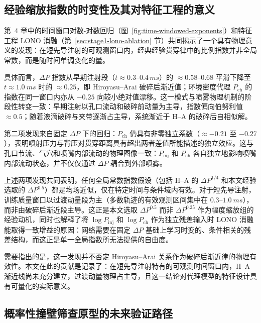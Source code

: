 \subsection{经验缩放指数的时变性及其对特征工程的意义}

第~4 章中的时间窗口对数-对数回归（图~\ref{fig:time-windowed-exponents}）和特征工程 LONO 消融（第~\ref{sec:stage1-lono-ablation} 节）共同揭示了一个具有物理意义的发现：在短先导注射的可观测窗口内，经典经验贯穿律中的比例指数并非全局常数，而是随时间单调变化的量。

具体而言，\(\Delta P\) 指数从早期注射段（\(t\approx0.3\)--\(0.4\,\si{ms}\)）的 \(\approx0.58\)--\(0.68\) 平滑下降至 \(t\approx\SI{1.0}{ms}\) 时的 \(\approx0.25\)，即 Hiroyasu--Arai 破碎后渐近值；环境密度代理 \(P_\mathrm{ch}\) 的指数在同一窗口内亦从 \(-0.25\) 向较小绝对值漂移。这一模式与喷雾物理机制的阶段性转变一致：早期注射以孔口流动和破碎前动量为主导，指数偏向伯努利值 \(\approx0.5\)；随着液滴破碎与夹带逐渐占主导，系统渐近于 H--A 的破碎后自相似解。

第二项发现来自固定 \(\Delta P\) 下的回归：\(P_\mathrm{ch}\) 仍具有非零独立系数（\(\approx-0.21\) 至 \(-0.27\)），表明喷射压力与背压对贯穿距离具有超出两者差值所能描述的独立效应。这与孔口节流、气穴和喷嘴内部流动的物理图像一致：\(P_\mathrm{inj}\) 和 \(P_\mathrm{ch}\) 各自独立地影响喷嘴内部流动状态，并不仅仅通过 \(\Delta P\) 耦合到外部喷雾。

上述两项发现共同表明，任何全局常数指数假设（包括 H--A 的 \(\Delta P^{1/4}\) 和本文经验选取的 \(\Delta P^{0.5}\)）都是均场近似，仅在特定时间与条件域内有效。对于短先导注射，训练质量窗口以过渡动量段为主（多数轨迹的有效观测区间集中在 \(0.3\)--\(\SI{1.0}{ms}\)），而非由破碎后渐近段主导。这正是本文选取 \(\Delta P^{0.5}\) 而非 \(\Delta P^{0.25}\) 作为幅度缩放组的经验动机，同时也解释了将 \(\log P_\mathrm{inj}\) 和 \(\log P_\mathrm{ch}\) 作为独立残差输入时 LONO 消融能取得一致增益的原因：网络需要在固定 \(\Delta P\) 基础上学习时变的、条件相关的残差结构，而这正是单一全局指数所无法提供的自由度。

需要指出的是，这一发现并不否定 Hiroyasu--Arai 关系作为破碎后渐近律的物理有效性。本文在此的贡献是记录了：在短先导注射特有的可观测时间窗口内，H--A 渐近线尚未充分建立，过渡动量物理占主导，且这一结论对代理模型的特征设计具有可量化的实际意义。

\subsection{概率性撞壁筛查原型的未来验证路径}
\label{sec:future-validation-pathways-zh}

